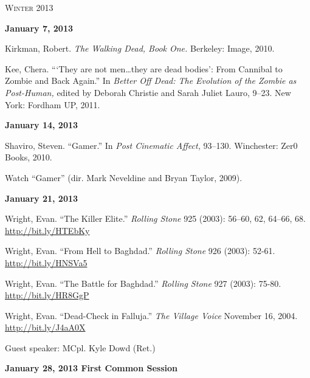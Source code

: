 \documentclass[12pt]{article}
\begin{document}
\vspace{.125in}

\begin{center}
{\Large \textsc{Winter 2013}}
\end{center}

\vspace{.125in}

\textbf{January 7, 2013}

\begin{hangparas}{.5in}{1}
Kirkman, Robert. \textit{The Walking Dead, Book One.} Berkeley: Image, 2010.

Kee, Chera. ```They are not men\ldots they are dead bodies': From Cannibal to Zombie and Back Again.'' In \textit{Better Off Dead: The Evolution of the Zombie as Post-Human,} edited by Deborah Christie and Sarah Juliet Lauro, 9--23. New York: Fordham UP, 2011. 
\end{hangparas}

\textbf{January 14, 2013}

\begin{hangparas}{.5in}{1}
Shaviro, Steven. ``Gamer.'' In \textit{Post Cinematic Affect,} 93--130. Winchester: Zer0 Books, 2010.

Watch ``Gamer'' (dir. Mark Neveldine and Bryan Taylor, 2009).
\end{hangparas}

\textbf{January 21, 2013}

\begin{hangparas}{.5in}{1}
Wright, Evan. ``The Killer Elite.'' \textit{Rolling Stone} 925 (2003): 56--60, 62, 64--66, 68.\\ \href{http://bit.ly/HTEbKy }{http://bit.ly/HTEbKy }

Wright, Evan. ``From Hell to Baghdad.'' \textit{Rolling Stone} 926 (2003): 52-61.\\ \href{http://bit.ly/HNSVa5}{http://bit.ly/HNSVa5}

Wright, Evan. ``The Battle for Baghdad.'' \textit{Rolling Stone} 927 (2003): 75-80.\\ \href{http://bit.ly/HR8GgP}{http://bit.ly/HR8GgP}

Wright, Evan. ``Dead-Check in Falluja.'' \textit{The Village Voice} November 16, 2004.\\ \href{http://bit.ly/J4aA0X}{http://bit.ly/J4aA0X}

Guest speaker: MCpl. Kyle Dowd (Ret.)
\end{hangparas}

\textbf{January 28, 2013 \hspace{.125in} First Common Session}
\end{document}
